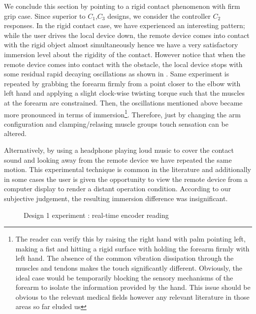 We conclude this section by pointing to a rigid contact phenomenon with firm grip case. Since superior to $C_1$,$C_3$ designs, we consider
the controller $C_2$ responses. In the rigid contact case, we have experienced an interesting pattern; while the user drives the local 
device down, the remote device comes into contact with the rigid object almost simultaneously hence we have a very satisfactory immersion level 
about the rigidity of the contact. However notice that when the remote device comes into contact with the obstacle, the local device stops 
with some residual rapid decaying oscillations as shown in . Same experiment is repeated by grabbing the 
forearm firmly from a point closer to the elbow with left hand and applying a slight clock-wise twisting torque such that the muscles 
at the forearm are constrained. Then, the oscillations mentioned above became more pronounced in terms of immersion\footnote{The reader can 
verify this by raising the right hand with palm pointing left, making a fist and hitting a rigid surface with holding the forearm firmly with 
left hand. The absence of the common vibration dissipation through the muscles and tendons makes the touch significantly different. Obviously, 
the ideal case would be temporarily blocking the sensory mechanisms of the forearm to isolate the information provided by the hand. This issue
should be obvious to the relevant medical fields however any relevant literature in those areas so far eluded us}. Therefore, just by changing 
the arm configuration and clamping/relasing muscle groups touch sensation can be altered. 

Alternatively, by using a headphone playing loud music to cover the contact sound and looking away from the remote device we have repeated the same
motion. This experimental technique is common in the literature and additionally in some cases the user is given the opportunity to view the remote 
device from a computer display to render a distant operation condition. According to our subjective judgement, the resulting immersion difference was 
insignificant. 


\newpage

\begin{figure}%
\centering
{}
\caption{Design 1 experiment : real-time encoder reading}%
\label{fig:app:design1overall}%
\end{figure}


